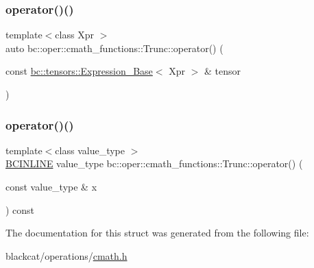 \mbox{\label{structbc_1_1oper_1_1cmath__functions_1_1Trunc_a791247c7e050f2553ec2c27f6b8b6880}} 
\subsubsection{\texorpdfstring{operator()()}{operator()()}\hspace{0.1cm}{\footnotesize\ttfamily [2/3]}}
{\footnotesize\ttfamily template$<$class Xpr $>$ \\
auto bc\+::oper\+::cmath\+\_\+functions\+::\+Trunc\+::operator() (\begin{DoxyParamCaption}\item[{const \hyperlink{classbc_1_1tensors_1_1Expression__Base}{bc\+::tensors\+::\+Expression\+\_\+\+Base}$<$ Xpr $>$ \&}]{tensor }\end{DoxyParamCaption})\hspace{0.3cm}{\ttfamily [inline]}}

\mbox{\label{structbc_1_1oper_1_1cmath__functions_1_1Trunc_a6dea236f3d8b1dc77f578efd8f700016}} 
\subsubsection{\texorpdfstring{operator()()}{operator()()}\hspace{0.1cm}{\footnotesize\ttfamily [3/3]}}
{\footnotesize\ttfamily template$<$class value\+\_\+type $>$ \\
\hyperlink{common_8h_a6699e8b0449da5c0fafb878e59c1d4b1}{B\+C\+I\+N\+L\+I\+NE} value\+\_\+type bc\+::oper\+::cmath\+\_\+functions\+::\+Trunc\+::operator() (\begin{DoxyParamCaption}\item[{const value\+\_\+type \&}]{x }\end{DoxyParamCaption}) const\hspace{0.3cm}{\ttfamily [inline]}}



The documentation for this struct was generated from the following file\+:\begin{DoxyCompactItemize}
\item 
blackcat/operations/\hyperlink{cmath_8h}{cmath.\+h}\end{DoxyCompactItemize}
